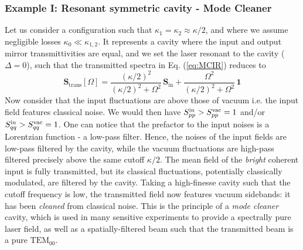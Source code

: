 \subsubsection{Example I: Resonant symmetric cavity - Mode Cleaner }
Let us consider a configuration such that $\kappa_1 = \kappa_2 \approx \kappa/2$, and where we assume negligible losses $\kappa_0 \ll \kappa_{1,2}$. It represents a cavity where the input and output mirror transmittivities are equal, and we set the laser resonant to the cavity ($\Delta=0$), such that the transmitted spectra in Eq. (\ref{eq:MCIR}) reduces to
\begin{equation}
  \mathbf{S}_{\mathrm{trans}}[\Omega] =\frac{(\kappa/2)^2}{(\kappa/2)^2+\Omega^2} \, \mathbf{S}_{\mathrm{in}}+\frac{\Omega^2}{(\kappa/2)^2+\Omega^2}  \,  \mathbf{1}
  \label{eq:MCIR2}
\end{equation}
Now consider that the input fluctuations are above those of vacuum i.e. the input field features classical noise. We would then have $S_{pp}^{\rm in}> S_{pp}^{\rm vac}=1$ and/or $S_{qq}^{\rm in}> S_{qq}^{\rm vac}=1$. One can notice that the prefactor to the input noises is a Lorentzian function - a low-pass filter. Hence, the noises of the input fields are low-pass filtered by the cavity, while the vacuum fluctuations are high-pass filtered precisely above the same cutoff $\kappa/2$. The mean field of the \textit{bright} coherent input is fully transmitted, but its classical fluctuations, potentially classically modulated, are filtered by the cavity. Taking a high-finesse cavity such that the cutoff frequency is low, the transmitted field now features vacuum sidebands: it has been \textit{cleaned} from classical noise. This is the principle of a \textit{mode cleaner} cavity, which is used in many sensitive experiments to provide a spectrally pure laser field, as well as a spatially-filtered beam such that the transmitted beam is a pure $\mathrm{TEM}_{00}$.


